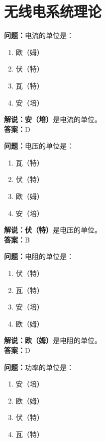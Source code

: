 \chapter{无线电系统理论}


\textbf{问题：}电流的单位是：

\begin{enumerate}[label=\Alph*), leftmargin=1.5cm]
	\item 欧（姆）
	\item 伏（特）
	\item 瓦（特）
	\item 安（培）
\end{enumerate}

\textbf{解说：}\textbf{安（培）}是电流的单位。\\\textbf{答案：}D



\textbf{问题：}电压的单位是：

\begin{enumerate}[label=\Alph*), leftmargin=1.5cm]
	\item 瓦（特）
	\item 伏（特）
	\item 欧（姆）
	\item 安（培）
\end{enumerate}

\textbf{解说：伏（特）}是电压的单位。\\\textbf{答案：}B



\textbf{问题：}电阻的单位是：

\begin{enumerate}[label=\Alph*), leftmargin=1.5cm]
	\item 伏（特）
	\item 瓦（特）
	\item 安（培）
	\item 欧（姆）
\end{enumerate}

\textbf{解说：欧（姆）}是电阻的单位。\\\textbf{答案：}D



\textbf{问题：}功率的单位是：

\begin{enumerate}[label=\Alph*), leftmargin=1.5cm]
	\item 安（培）
	\item 欧（姆）
	\item 伏（特）
	\item 瓦（特）
\end{enumerate}


